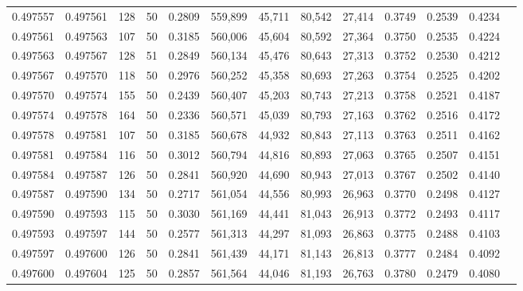 \begin{tabular}{rrrrrrrrrrrrr}
0.497557 & 0.497561 &   128 &  50 &                                     0.2809 & 559,899 &  45,711 &  80,542 &  27,414 & 0.3749 & 0.2539 & 0.4234 \\
0.497561 & 0.497563 &   107 &  50 &                                     0.3185 & 560,006 &  45,604 &  80,592 &  27,364 & 0.3750 & 0.2535 & 0.4224 \\
0.497563 & 0.497567 &   128 &  51 &                                     0.2849 & 560,134 &  45,476 &  80,643 &  27,313 & 0.3752 & 0.2530 & 0.4212 \\
0.497567 & 0.497570 &   118 &  50 &                                     0.2976 & 560,252 &  45,358 &  80,693 &  27,263 & 0.3754 & 0.2525 & 0.4202 \\
0.497570 & 0.497574 &   155 &  50 &                                     0.2439 & 560,407 &  45,203 &  80,743 &  27,213 & 0.3758 & 0.2521 & 0.4187 \\
0.497574 & 0.497578 &   164 &  50 &                                     0.2336 & 560,571 &  45,039 &  80,793 &  27,163 & 0.3762 & 0.2516 & 0.4172 \\
0.497578 & 0.497581 &   107 &  50 &                                     0.3185 & 560,678 &  44,932 &  80,843 &  27,113 & 0.3763 & 0.2511 & 0.4162 \\
0.497581 & 0.497584 &   116 &  50 &                                     0.3012 & 560,794 &  44,816 &  80,893 &  27,063 & 0.3765 & 0.2507 & 0.4151 \\
0.497584 & 0.497587 &   126 &  50 &                                     0.2841 & 560,920 &  44,690 &  80,943 &  27,013 & 0.3767 & 0.2502 & 0.4140 \\
0.497587 & 0.497590 &   134 &  50 &                                     0.2717 & 561,054 &  44,556 &  80,993 &  26,963 & 0.3770 & 0.2498 & 0.4127 \\
0.497590 & 0.497593 &   115 &  50 &                                     0.3030 & 561,169 &  44,441 &  81,043 &  26,913 & 0.3772 & 0.2493 & 0.4117 \\
0.497593 & 0.497597 &   144 &  50 &                                     0.2577 & 561,313 &  44,297 &  81,093 &  26,863 & 0.3775 & 0.2488 & 0.4103 \\
0.497597 & 0.497600 &   126 &  50 &                                     0.2841 & 561,439 &  44,171 &  81,143 &  26,813 & 0.3777 & 0.2484 & 0.4092 \\
0.497600 & 0.497604 &   125 &  50 &                                     0.2857 & 561,564 &  44,046 &  81,193 &  26,763 & 0.3780 & 0.2479 & 0.4080 \\

\end{tabular}
